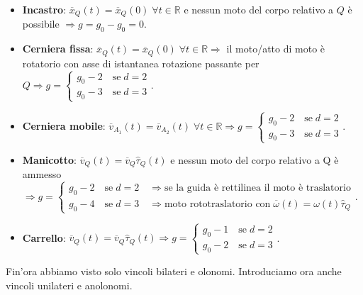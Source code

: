 \documentclass{book}
\theoremstyle{plain}
\theoremstyle{plain}
\theoremstyle{plain}
\theoremstyle{plain}
\theoremstyle{plain}
\theoremstyle{definition}
\theoremstyle{remark}
\theoremstyle{definition}
\begin{document}
\begin{itemize}
    \item \textbf{Incastro}: $\overline{x}_Q(t)=\overline{x}_Q(0) \; \forall t \in \mathbb{R}$ e nessun moto del corpo relativo a $Q$ è possibile $\Longrightarrow g=g_0-g_0=0$.
    \item \textbf{Cerniera fissa}: $\overline{x}_Q(t)=\overline{x}_Q(0) \; \forall t \in \mathbb{R} \Longrightarrow$ il moto/atto di moto è rotatorio con asse di istantanea rotazione passante per $Q \Longrightarrow g=
    \begin{cases}
        g_0 - 2 \quad \text{se} \; d=2\\ g_0 - 3 \quad \text{se} \; d=3
    \end{cases}$.
    \item \textbf{Cerniera mobile}: $\overline{v}_{A_1}(t)=\overline{v}_{A_2}(t) \; \forall t \in \mathbb{R} \Longrightarrow g=
    \begin{cases}
        g_0 - 2 \quad \text{se} \; d=2\\ g_0 - 3 \quad \text{se} \; d=3
    \end{cases}$.
    \item \textbf{Manicotto}:
    $\overline{v}_{Q}(t)=\overline{v}_{Q}\hat{\tau}_Q(t)$ e nessun moto del corpo relativo a Q è ammesso $\Longrightarrow g=
    \begin{cases}
        g_0 - 2 \quad \text{se} \; d=2 \quad \Longrightarrow \text{se la guida è rettilinea il moto è traslatorio} \\ g_0 - 4 \quad \text{se} \; d=3 \quad \Longrightarrow \text{moto rototraslatorio con} \; \overline{\omega}(t)=\omega(t)\hat{\tau}_Q
    \end{cases}$.
    \item \textbf{Carrello}:
    $\overline{v}_{Q}(t)=\overline{v}_{Q}\hat{\tau}_Q(t)\Longrightarrow g=
    \begin{cases}
        g_0 - 1 \quad \text{se} \; d=2 \\ g_0 - 2 \quad \text{se} \; d=3
    \end{cases}$.
\end{itemize}

\noindent Fin'ora abbiamo visto solo vincoli bilateri e olonomi. Introduciamo ora anche vincoli unilateri e anolonomi.
\end{document}
